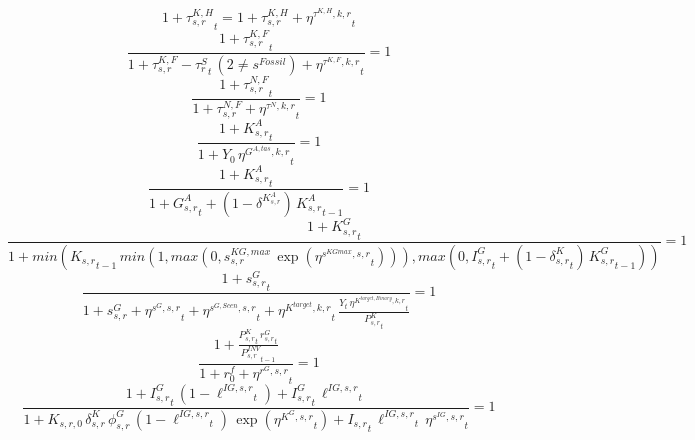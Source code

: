 \begin{dmath}
1+{{\tau^{K,H}_{s,r}}}_{t}=1+{{\tau^{K,H}_{s,r}}}+{{\eta^{\tau^{K,H},k,r}}}_{t}
\end{dmath}
\noindent[name= `sector specific corporate tax rate paid by firms 2 1']
\begin{dmath}
\frac{1+{{\tau^{K,F}_{s,r}}}_{t}}{1+{{\tau^{K,F}_{s,r}}}-{{\tau^{S}_{r}}}_{t}\, \left(2\neq {{s^{Fossil}}}\right)+{{\eta^{\tau^{K,F},k,r}}}_{t}}=1
\end{dmath}
\noindent[name= `sector specific labour tax rate paid by firms 2 1']
\begin{dmath}
\frac{1+{{\tau^{N,F}_{s,r}}}_{t}}{1+{{\tau^{N,F}_{s,r}}}+{{\eta^{\tau^{N},k,r}}}_{t}}=1
\end{dmath}
\noindent[name= `sector specific adaptation capital target from government expenditure 2 1']
\begin{dmath}
\frac{1+{{K^{A}_{s,r}}}_{t}}{1+{{Y_0}}\, {{\eta^{G^{A,tas},k,r}}}_{t}}=1
\end{dmath}
\noindent[name= `sector specific adaptation capital against climate change 2 1']
\begin{dmath}
\frac{1+{{K^{A}_{s,r}}}_{t}}{1+{{G^{A}_{s,r}}}_{t}+\left(1-{{\delta^{K^{A}_{s,r}}}}\right)\, {{K^{A}_{s,r}}}_{t-1}}=1
\end{dmath}
\noindent[name= `sector specific public capital 2 1']
\begin{dmath}
\frac{1+{{K^G_{s,r}}}_{t}}{1+min({{K_{s,r}}}_{t-1}\, min(1,max(0,{{s^{KG,max}_{s,r}}}\, \exp\left({{\eta^{s^{KGmax},s,r}}}_{t}\right))),max(0,{{I^G_{s,r}}}_{t}+\left(1-{{\delta^{K}_{s,r}}}_{t}\right)\, {{K^G_{s,r}}}_{t-1}))}=1
\end{dmath}
\noindent[name= `sector specific public investment 2 1']
\begin{dmath}
\frac{1+{{s^G_{s,r}}}_{t}}{1+{{s^{G}_{s,r}}}+{{\eta^{s^G,s,r}}}_{t}+{{\eta^{s^{G,Scen},s,r}}}_{t}+{{\eta^{K^{target},k,r}}}_{t}\, \frac{{Y}_{t}\, {{\eta^{K^{target,Binary},k,r}}}_{t}}{{{P^K_{s,r}}}_{t}}}=1
\end{dmath}
\noindent[name= `sector specific public rental rate 2 1']
\begin{dmath}
\frac{1+\frac{{{P^K_{s,r}}}_{t}\, {{r^G_{s,r}}}_{t}}{{{P^{INV}_{s,r}}}_{t-1}}}{1+{{r^f_0}}+{{\eta^{r^G,s,r}}}_{t}}=1
\end{dmath}
\noindent[name= `scenario sector specific public capital / investment share 2 1']
\begin{dmath}
\frac{1+{{I^G_{s,r}}}_{t}\, \left(1-{{\ell^{IG,s,r}}}_{t}\right)+{{I^G_{s,r}}}_{t}\, {{\ell^{IG,s,r}}}_{t}}{1+{{K_{s,r,0}}}\, {{\delta^{K}_{s,r}}}\, {{\phi^{G}_{s,r}}}\, \left(1-{{\ell^{IG,s,r}}}_{t}\right)\, \exp\left({{\eta^{K^G,s,r}}}_{t}\right)+{{I_{s,r}}}_{t}\, {{\ell^{IG,s,r}}}_{t}\, {{\eta^{s^{IG},s,r}}}_{t}}=1
\end{dmath}
